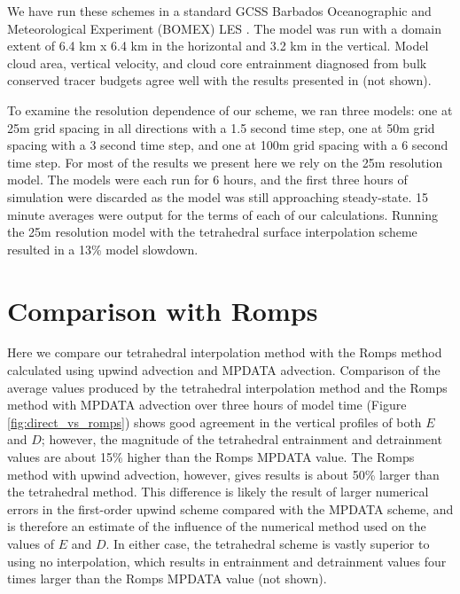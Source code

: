 \documentclass[12pt]{article}
\begin{document}
We have run these schemes in a standard GCSS Barbados Oceanographic and 
Meteorological Experiment (BOMEX) LES \citep{Holland1973, Siebesma2003}.  The 
model was run with a domain extent of 6.4 km x 6.4 km in the horizontal and 
3.2 km in the vertical.  Model cloud area, vertical velocity, and cloud core 
entrainment diagnosed from bulk conserved tracer budgets agree well with the 
results presented in \cite{Siebesma2003} (not shown).

To examine the resolution dependence of our scheme, we ran three models: one at 
25m grid spacing in all directions with a 1.5 second time step, one at 50m grid 
spacing with a 3 second time step, and one at 100m grid spacing with a 6 second 
time step.  For most of the results we present here we rely on the 25m 
resolution model.  The models were each run for 6 hours, and the first 
three hours of simulation were discarded as the model was still approaching
steady-state.  15 minute averages were output for the terms of each of our 
calculations.  Running the 25m resolution model with the tetrahedral surface 
interpolation scheme resulted in a 13\% model slowdown.  


\section{Comparison with Romps}

Here we compare our tetrahedral interpolation method with the Romps method 
calculated using upwind advection and MPDATA advection.  Comparison of the 
average values produced by the tetrahedral interpolation method and the Romps 
method with MPDATA advection over three hours of model time (Figure 
\ref{fig:direct_vs_romps}) shows good agreement in the vertical profiles of 
both $E$ and $D$; however, the magnitude of the tetrahedral entrainment and 
detrainment values are about 15\% higher than the Romps MPDATA value.  The 
Romps method with upwind advection, however, gives results is about 50\% larger 
than the tetrahedral method.  This difference is likely the result of larger 
numerical errors in the first-order upwind scheme compared with the MPDATA 
scheme, and is therefore an estimate of the influence of the numerical method 
used on the values of $E$ and $D$.  In either case, the tetrahedral scheme is 
vastly superior to using no interpolation, which results in entrainment and 
detrainment values four times larger than the Romps MPDATA value (not shown).  
\end{document}
